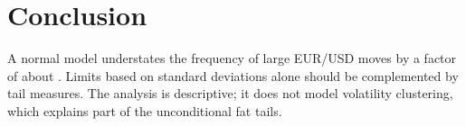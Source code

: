 \section{Conclusion}

A normal model understates the frequency of large EUR/USD moves by a factor of about
. Limits based on standard deviations alone should be complemented by
tail measures. The analysis is descriptive; it does not model volatility clustering,
which explains part of the unconditional fat tails.
